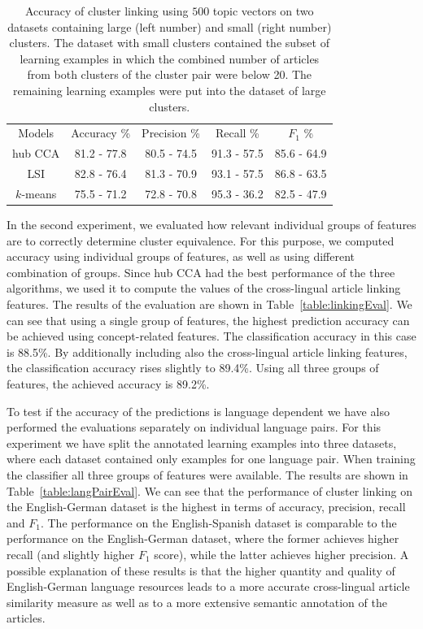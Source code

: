 \begin{table}[t]
\begin{center}
\begin{tabular}{|c|c|c|c|c|}
  \hline
  \cline{1-5}
  Models & Accuracy \% & Precision \% & Recall \% & $F_1$ \% \\ \cline{1-5}
  hub CCA  & 81.2 - 77.8 & 80.5 - 74.5 & 91.3 - 57.5 & 85.6 - 64.9 \\ \cline{1-5}
  LSI      & 82.8 - 76.4 & 81.3 - 70.9 & 93.1 - 57.5 & 86.8 - 63.5 \\ \cline{1-5}
 $k$-means & 75.5 - 71.2 & 72.8 - 70.8 & 95.3 - 36.2 & 82.5 - 47.9 \\ \cline{1-5}
\end{tabular}
\end{center}
\caption{Accuracy of cluster linking using $500$ topic vectors on two datasets containing large (left number)
and small (right number) clusters. The dataset with small clusters contained the subset of
learning examples in which the combined number of articles from both clusters of the cluster
pair were below 20. The remaining learning examples were put into the dataset of large clusters.}
\label{table:linkingEvalAlgosLargeSmall}
\end{table}

In the second experiment, we evaluated how relevant individual groups of features are 
to correctly determine cluster equivalence. For this purpose, we computed accuracy using 
individual groups of features, as well as using different combination of groups. 
Since hub CCA had the best performance of the three algorithms, we used it to compute 
the values of the cross-lingual article linking features. The results of the evaluation 
are shown in Table~\ref{table:linkingEval}. We can see that using a single group of features, 
the highest prediction accuracy can be achieved using concept-related features. 
The classification accuracy in this case is 88.5\%. By additionally including also the 
cross-lingual article linking features, the classification accuracy rises slightly 
to 89.4\%. Using all three groups of features, the achieved accuracy is 89.2\%.

To test if the accuracy of the predictions is language dependent we have also 
performed the evaluations separately on individual language pairs. For this 
experiment we have split the annotated learning examples into three datasets, 
where each dataset contained only examples for one language pair. When 
training the classifier all three groups of features were available. The 
results are shown in Table~\ref{table:langPairEval}. We can see that the 
performance of cluster linking on the English-German dataset is the highest 
in terms of accuracy, precision, recall and $F_1$. The performance on the 
English-Spanish dataset is comparable to the performance on the English-German 
dataset, where the former achieves higher recall (and slightly higher $F_1$ score), 
while the latter achieves higher precision. A possible explanation of these 
results is that the higher quantity and quality of English-German language 
resources leads to a more accurate cross-lingual article similarity measure 
as well as to a more extensive semantic annotation of the articles.


